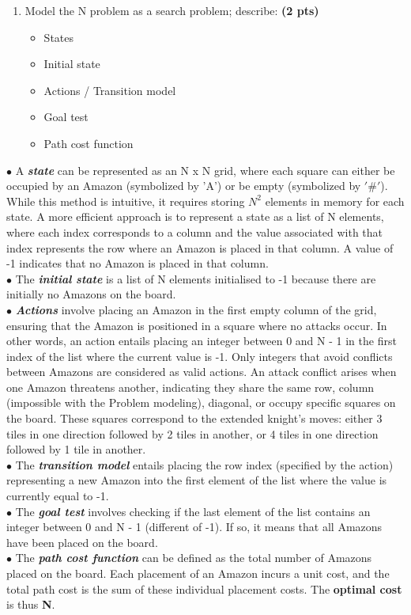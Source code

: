 \documentclass[11pt,a4paper]{report}
\begin{document}
\begin{enumerate}
  \item Model the N problem as a search problem; describe: \textbf{(2 pts)}
		\begin{itemize}
			\item States
			\item Initial state
			\item Actions / Transition model
			\item Goal test
			\item Path cost function
		\end{itemize}
\end{enumerate}

\begin{answers}[8cm]
\small{$\bullet$ A \textbf{\textit{state}} can be represented as an N x N grid, where each square can either be occupied by an Amazon (symbolized by 'A') or be empty (symbolized by $'\#'$). While this method is intuitive, it requires storing $N^2$ elements in memory for each state. A more efficient approach is to represent a state as a list of N elements, where each index corresponds to a column and the value associated with that index represents the row where an Amazon is placed in that column. A value of -1 indicates that no Amazon is placed in that column. \\
$\bullet$ The \textbf{\textit{initial state}} is a list of N elements initialised to -1 because there are initially no Amazons on the board. \\
$\bullet$ \textbf{\textit{Actions}} involve placing an Amazon in the first empty column of the grid, ensuring that the Amazon is positioned in a square where no attacks occur. In other words, an action entails placing an integer between 0 and N - 1 in the first index of the list where the current value is -1. Only integers that avoid conflicts between Amazons are considered as valid actions. An attack conflict arises when one Amazon threatens another, indicating they share the same row, column (impossible with the Problem modeling), diagonal, or occupy specific squares on the board. These squares correspond to the extended knight's moves: either 3 tiles in one direction followed by 2 tiles in another, or 4 tiles in one direction followed by 1 tile in another. \\
$\bullet$ The \textbf{\textit{transition model}} entails placing the row index (specified by the action) representing a new Amazon into the first element of the list where the value is currently equal to -1. \\
$\bullet$ The \textbf{\textit{goal test}} involves checking if the last element of the list contains an integer between 0 and N - 1 (different of -1). If so, it means that all Amazons have been placed on the board. \\
$\bullet$ The \textbf{\textit{path cost function}} can be defined as the total number of Amazons placed on the board. Each placement of an Amazon incurs a unit cost, and the total path cost is the sum of these individual placement costs. The \textbf{optimal cost} is thus \textbf{N}.}
\end{answers}
\end{document}
